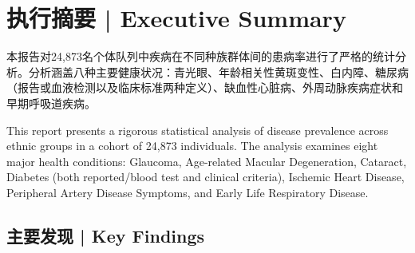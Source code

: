 \documentclass[12pt,a4paper]{article}
\begin{document}
\tableofcontents
\newpage

\section{执行摘要 | Executive Summary}

本报告对24,873名个体队列中疾病在不同种族群体间的患病率进行了严格的统计分析。分析涵盖八种主要健康状况：青光眼、年龄相关性黄斑变性、白内障、糖尿病（报告或血液检测以及临床标准两种定义）、缺血性心脏病、外周动脉疾病症状和早期呼吸道疾病。

This report presents a rigorous statistical analysis of disease prevalence across ethnic groups in a cohort of 24,873 individuals. The analysis examines eight major health conditions: Glaucoma, Age-related Macular Degeneration, Cataract, Diabetes (both reported/blood test and clinical criteria), Ischemic Heart Disease, Peripheral Artery Disease Symptoms, and Early Life Respiratory Disease.

\subsection{主要发现 | Key Findings}
\end{document}
